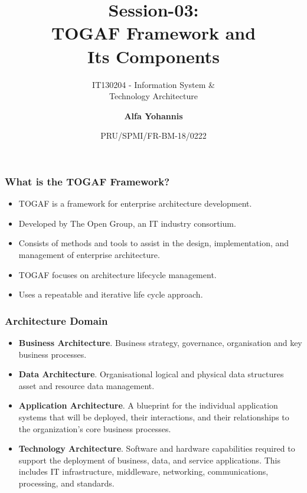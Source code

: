 \documentclass[aspectratio=169, table]{beamer}
\subtitle{IT130204 - Information System \&\\Technology Architecture}
\title{Session-03:\LARGE{\\TOGAF Framework and \\ Its Components}
}
\date[Serial]{\scriptsize {PRU/SPMI/FR-BM-18/0222}}
\author[Pradita]{\vspace{10pt}\small{\textbf{Alfa Yohannis}}}
\begin{document}
	
	\frame{\titlepage}
	
	\begin{frame}
		\frametitle{What is the TOGAF Framework?}
		\begin{itemize}
			\item TOGAF is a framework for enterprise architecture development.
			\item Developed by The Open Group, an IT industry consortium.
			\item Consists of methods and tools to assist in the design, implementation, and management of enterprise architecture.
			\item TOGAF focuses on architecture lifecycle management.
			\item Uses a repeatable and iterative life cycle approach.
		\end{itemize}
	\end{frame}
	
	\begin{frame}
		\frametitle{Architecture Domain}
		\vspace{20pt}
		\begin{itemize}
			\item \textbf{Business Architecture}. Business strategy, governance, organisation and key business processes.
			
			\item \textbf{Data Architecture}. Organisational logical and physical data structures
			asset and resource data management.
			
			\item \textbf{Application Architecture}. A blueprint for the individual application systems that will be deployed, their interactions, and their relationships to the organization's core business processes.
			
			\item \textbf{Technology Architecture}. Software and hardware capabilities required to support the deployment of business, data, and service applications. This includes IT infrastructure, middleware, networking, communications, processing, and standards.
		\end{itemize}
	\end{frame}
	
\end{document}
